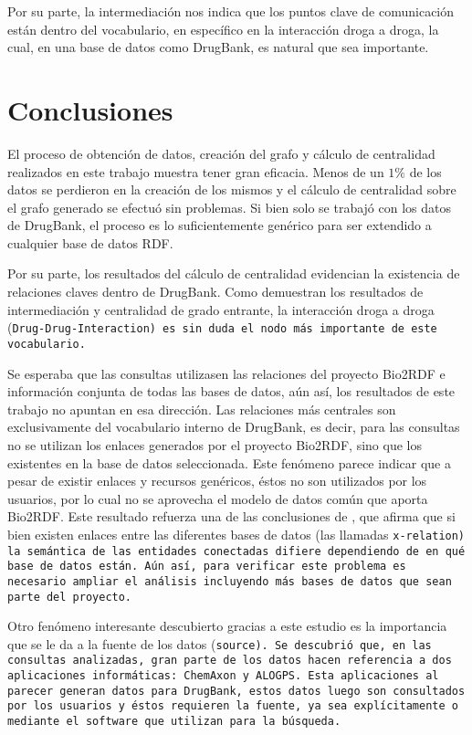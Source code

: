 Por su parte, la intermediación nos indica que los puntos clave de comunicación
están dentro del vocabulario, en específico en la interacción droga a droga, la
cual, en una base de datos como DrugBank, es natural que sea importante.

\section{Conclusiones}\label{sec:con}
El proceso de obtención de datos, creación del grafo y cálculo de centralidad
realizados en este trabajo muestra tener gran eficacia. Menos de un $1\%$ de los
datos se perdieron en la creación de los mismos y el cálculo de centralidad
sobre el grafo generado se efectuó sin problemas. Si bien solo se trabajó con
los datos de DrugBank, el proceso es lo suficientemente genérico para ser
extendido a cualquier base de datos RDF.

Por su parte, los resultados del cálculo de centralidad evidencian la existencia
de relaciones claves dentro de DrugBank.
Como demuestran los resultados de intermediación y centralidad de grado
entrante, la interacción droga a droga (\tt{Drug-Drug-Interaction}) es sin duda
el nodo más importante de este vocabulario.

Se esperaba que las consultas utilizasen las relaciones del proyecto Bio2RDF e
información conjunta de todas las bases de datos, aún así, los resultados de
este trabajo no apuntan en esa dirección.
Las relaciones más centrales son exclusivamente del vocabulario interno de
DrugBank, es decir, para las consultas no se utilizan los enlaces generados por
el proyecto Bio2RDF, sino que los existentes en la base de datos seleccionada.
Este fenómeno parece indicar que a pesar de existir enlaces y recursos
genéricos, éstos no son utilizados por los usuarios, por lo cual no se
aprovecha el modelo de datos común que aporta Bio2RDF.
Este resultado refuerza una de las conclusiones de \cite{hu2015link}, que afirma
que si bien existen enlaces entre las diferentes bases de datos (las llamadas
\tt{x-relation}) la semántica de las entidades conectadas difiere dependiendo de
en qué base de datos están.
Aún así, para verificar este problema es necesario ampliar el análisis
incluyendo más bases de datos que sean parte del proyecto.

Otro fenómeno interesante descubierto  gracias a este estudio es la importancia
que se le da a la fuente de los datos (\tt{source}).
Se descubrió que, en las consultas analizadas, gran parte de los datos hacen
referencia a dos aplicaciones informáticas: ChemAxon y ALOGPS.
Esta aplicaciones al parecer generan datos para DrugBank, estos datos luego son
consultados por los usuarios y éstos requieren la fuente, ya sea explícitamente
o mediante el software que utilizan para la búsqueda.

